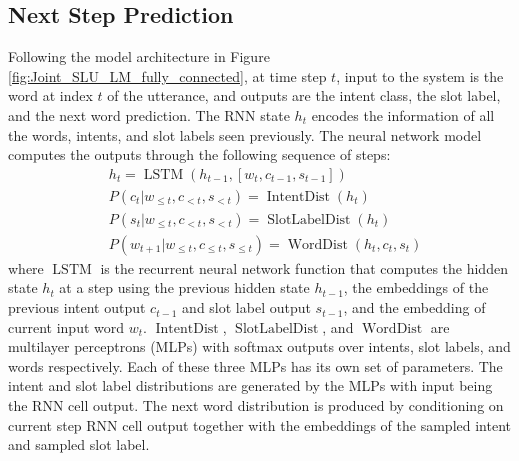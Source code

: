 \documentclass[11pt]{article}
\begin{document}
\subsection{Next Step Prediction}
    Following the model architecture in Figure \ref{fig:Joint_SLU_LM_fully_connected}, at time step $t$, input to the system is the word at index $t$ of the utterance, and outputs are the intent class, the slot label, and the next word prediction. The RNN state $h_t$ encodes the information of all the words, intents, and slot labels seen previously. The neural network model computes the outputs through the following sequence of steps:
        \begin{align}
            &h_t = \operatorname{LSTM}(h_{t-1}, [w_t, c_{t-1}, s_{t-1}]) \\
            &P(c_t|w_{\leq t}, c_{<t}, s_{<t}) = \operatorname{IntentDist}(h_{t}) \\
            &P(s_t|w_{\leq t}, c_{<t}, s_{<t}) = \operatorname{SlotLabelDist}(h_{t}) \\
            &P(w_{t+1}|w_{\leq t}, c_{\leq t}, s_{\leq t}) = \operatorname{WordDist}(h_{t}, c_{t}, s_{t})
        \end{align}
    where $\operatorname{LSTM}$ is the recurrent neural network function that computes the hidden state $h_t$ at a step using the previous hidden state $h_{t-1}$, the embeddings of the previous intent output $c_{t-1}$ and slot label output $s_{t-1}$, and the embedding of current input word $w_t$. $\operatorname{IntentDist}$, $\operatorname{SlotLabelDist}$, and $\operatorname{WordDist}$ are multilayer perceptrons (MLPs) with softmax outputs over intents, slot labels, and words respectively. Each of these three MLPs has its own set of parameters. The intent and slot label distributions are generated by the MLPs with input being the RNN cell output. The next word distribution is produced by conditioning on current step RNN cell output together with the embeddings of the sampled intent and  sampled slot label.
\end{document}
